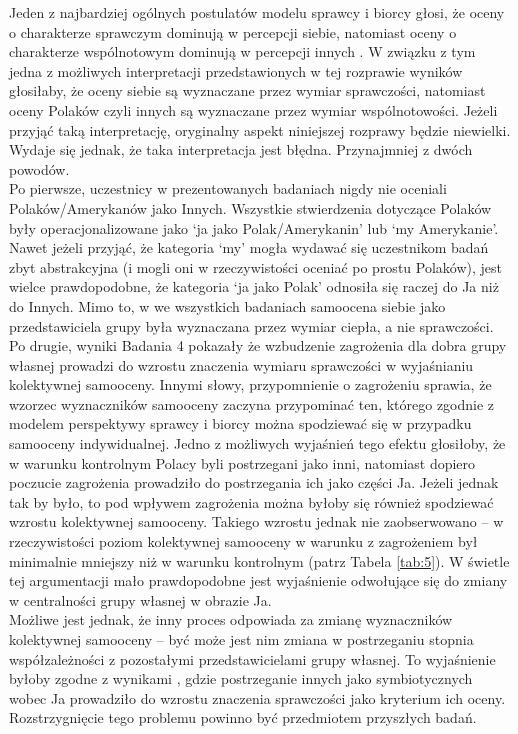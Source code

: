 \documentclass[man]{apa6}
\begin{document}
Jeden z najbardziej ogólnych postulatów modelu sprawcy i biorcy głosi, że oceny o charakterze sprawczym dominują w percepcji siebie, natomiast oceny o charakterze wspólnotowym dominują w percepcji innych \parencite[patrz,][]{wojciszke2005morality}. W związku z tym jedna z możliwych interpretacji przedstawionych w tej rozprawie wyników głosiłaby, że oceny siebie są wyznaczane przez wymiar sprawczości, natomiast oceny Polaków czyli innych są wyznaczane przez wymiar wspólnotowości. Jeżeli przyjąć taką interpretację, oryginalny aspekt niniejszej rozprawy będzie niewielki. Wydaje się jednak, że taka interpretacja jest błędna. Przynajmniej z dwóch powodów.\\

Po pierwsze, uczestnicy w prezentowanych badaniach nigdy nie oceniali Polaków/Amerykanów jako Innych. Wszystkie stwierdzenia dotyczące Polaków były operacjonalizowane jako `ja jako Polak/Amerykanin' lub `my Amerykanie'. Nawet jeżeli przyjąć, że kategoria `my' mogła wydawać się uczestnikom badań zbyt abstrakcyjna (i mogli oni w rzeczywistości oceniać po prostu Polaków), jest wielce prawdopodobne, że kategoria `ja jako Polak' odnosiła się raczej do Ja niż do Innych. Mimo to, w we wszystkich badaniach samoocena siebie jako przedstawiciela grupy była wyznaczana przez wymiar ciepła, a nie sprawczości.\\

Po drugie, wyniki Badania 4 pokazały że wzbudzenie zagrożenia dla dobra grupy własnej prowadzi do wzrostu znaczenia wymiaru sprawczości w wyjaśnianiu kolektywnej samooceny. Innymi słowy, przypomnienie o zagrożeniu sprawia, że wzorzec wyznaczników samooceny zaczyna przypominać ten, którego zgodnie z modelem perspektywy sprawcy i biorcy można spodziewać się w przypadku samooceny indywidualnej. Jedno z możliwych wyjaśnień tego efektu głosiłoby, że w warunku kontrolnym Polacy byli postrzegani jako inni, natomiast dopiero poczucie zagrożenia prowadziło do postrzegania ich jako części Ja. Jeżeli jednak tak by było, to pod wpływem zagrożenia można byłoby się również spodziewać wzrostu kolektywnej samooceny. Takiego wzrostu jednak nie zaobserwowano -- w rzeczywistości poziom kolektywnej samooceny w warunku z zagrożeniem był minimalnie mniejszy niż w warunku kontrolnym (patrz Tabela \ref{tab:5}). W świetle tej argumentacji mało prawdopodobne jest wyjaśnienie odwołujące się do zmiany w centralności grupy własnej w obrazie Ja.\\

Możliwe jest jednak, że inny proces odpowiada za zmianę wyznaczników kolektywnej samooceny -- być może jest nim zmiana w postrzeganiu stopnia współzależności z pozostałymi przedstawicielami grupy własnej. To wyjaśnienie byłoby zgodne z wynikami \textcite{wojciszke2008primacy}, gdzie postrzeganie innych jako symbiotycznych wobec Ja prowadziło do wzrostu znaczenia sprawczości jako kryterium ich oceny. Rozstrzygnięcie tego problemu powinno być przedmiotem przyszłych badań. \\
\end{document}
